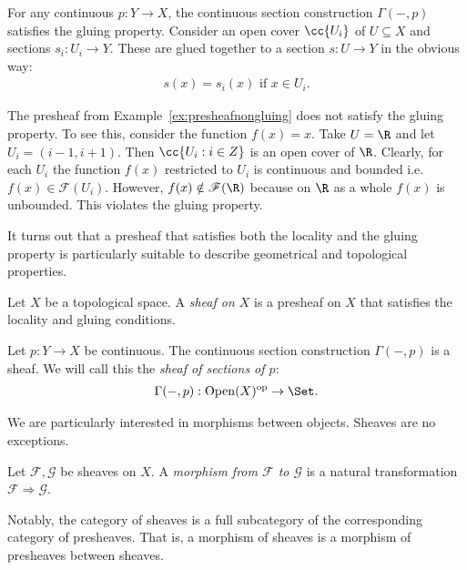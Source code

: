 \documentclass{article}
\begin{document}
\begin{example}
  For any continuous $p:Y\to X$, the continuous section construction
  $\Gamma(-,p)$ satisfies the gluing property. Consider an open cover
  $\cc{U_i}$ of $U\subseteq X$ and sections $s_i:U_i\to Y$. These are
  glued together to a section $s:U\to Y$ in the obvious way:
  \begin{align*}
    s(x) = s_i(x) \text{ if $x\in U_i$}.
  \end{align*}
\end{example}

\begin{nonexample}
  The presheaf from Example~\ref{ex:presheafnongluing} does not satisfy the 
  gluing property. To see this, consider the function $f(x) = x$. Take $U = \R$
  and let $U_i = (i-1, i+1)$. Then $\cc{U_i : i \in Z}$ is an open cover of $\R$.
  Clearly, for each $U_i$ the function $f(x)$ restricted to $U_i$ is continuous 
  and bounded i.e. $f(x) \in \mathscr F(U_i)$. However, $f(x) \notin \mathscr F(\R)$ 
  because on $\R$ as a whole $f(x)$ is unbounded. This violates the gluing property.
\end{nonexample}

It turns out that a presheaf that satisfies both the locality and the
gluing property is particularly suitable to describe geometrical
and topological properties.

\begin{definition}
  Let $X$ be a topological space. A \emph{sheaf on $X$} is a presheaf
  on $X$ that satisfies the locality and gluing conditions.
\end{definition}

\begin{example}
  Let $p:Y\to X$ be continuous. The continuous section construction
  $\Gamma(-,p)$ is a sheaf. We will call this the \emph{sheaf of
  sections of $p$}:
  \begin{align*}
    \Gamma(-,p) : \Open(X)^{\text{op}} \to \Set.
  \end{align*}
\end{example}

We are particularly interested in morphisms between objects. Sheaves
are no exceptions.
\begin{definition}
  Let $\mathscr F,\mathscr G$ be sheaves on $X$. A \emph{morphism from
  $\mathscr F$ to $\mathscr G$} is a natural transformation
  $\mathscr F\Rightarrow\mathscr G$.
\end{definition}

Notably, the category of sheaves is a full subcategory
of the corresponding category of presheaves. That is, a morphism
of sheaves is a morphism of presheaves between sheaves.
\end{document}
